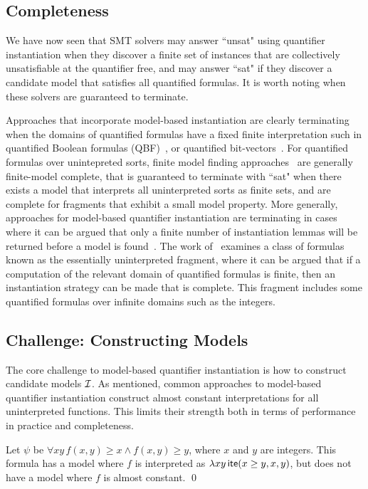 \documentclass[oribibl]{llncs}
\begin{document}
\subsection{Completeness}
We have now seen that SMT solvers may answer ``unsat" using quantifier instantiation
when they discover a finite set of instances that are collectively unsatisfiable at the quantifier free,
and may answer ``sat" if they discover a candidate model that satisfies all quantified formulas.
It is worth noting when these solvers are guaranteed to terminate.

Approaches that incorporate model-based instantiation are clearly terminating
when the domains of quantified formulas have a fixed finite interpretation
such in quantified Boolean formulas (QBF)~\cite{janota2012solving},
or quantified bit-vectors~\cite{wintersteiger2013efficiently}.
For quantified formulas over unintepreted sorts,
finite model finding approaches~\cite{ReyEtAl-1-RR-13} are generally finite-model complete,
that is guaranteed to terminate with ``sat" when there exists a model that interprets
all uninterpreted sorts as finite sets, and are complete for fragments
that exhibit a small model property.
More generally, approaches for model-based quantifier instantiation are terminating in cases
where it can be argued that only a finite number of instantiation lemmas will be returned before 
a model is found~\cite{ihlemann2008local,GeDeM-CAV-09}.
The work of~\cite{GeDeM-CAV-09} examines a class of formulas known as the essentially uninterpreted fragment,
where it can be argued that if a computation of the relevant domain of quantified formulas is finite,
then an instantiation strategy can be made that is complete.
This fragment includes some quantified formulas over infinite domains such as the integers.

\subsection{Challenge: Constructing Models}
The core challenge to model-based quantifier instantiation is how to construct candidate models $\mathcal{I}$.
As mentioned, common approaches to model-based quantifier instantiation
construct almost constant interpretations for all uninterpreted functions.
This limits their strength both in terms of performance in practice and completeness.

\begin{example}
Let $\psi$ be $\forall xy\, f( x, y ) \geq x \wedge f( x, y ) \geq y$, where $x$ and $y$ are integers.
This formula has a model where $f$ is interpreted as $\lambda xy\, \mathsf{ite}( x \geq y, x, y )$,
but does not have a model where $f$ is almost constant.
\qed
\end{example}
\end{document}
